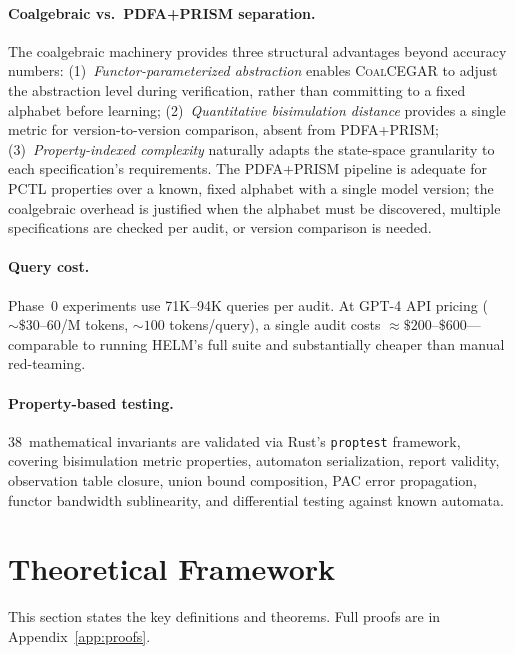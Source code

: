 \documentclass[11pt]{article}
\newcommand{\coalcegar}{\textsc{CoalCEGAR}}
\begin{document}
\paragraph{Coalgebraic vs.\ PDFA+PRISM separation.}
The coalgebraic machinery provides three structural advantages beyond
accuracy numbers:
(1)~\emph{Functor-parameterized abstraction} enables \coalcegar{}
to adjust the abstraction level during verification, rather than
committing to a fixed alphabet before learning;
(2)~\emph{Quantitative bisimulation distance} provides a single
metric for version-to-version comparison, absent from PDFA+PRISM;
(3)~\emph{Property-indexed complexity} naturally adapts the
state-space granularity to each specification's requirements.
The PDFA+PRISM pipeline is adequate for PCTL properties over a
known, fixed alphabet with a single model version; the coalgebraic
overhead is justified when the alphabet must be discovered, multiple
specifications are checked per audit, or version comparison is needed.

\paragraph{Query cost.}
Phase~0 experiments use 71K--94K queries per audit.  At GPT-4 API
pricing (${\sim}\$30$--$60$/M tokens, ${\sim}100$ tokens/query),
a single audit costs ${\approx}\$200$--$\$600$---comparable to
running HELM's full suite and substantially cheaper than manual
red-teaming.

\paragraph{Property-based testing.}
38~mathematical invariants are validated via Rust's \texttt{proptest}
framework, covering bisimulation metric properties, automaton
serialization, report validity, observation table closure,
union bound composition, PAC error propagation, functor bandwidth
sublinearity, and differential testing against known automata.

\section{Theoretical Framework}\label{sec:theory}

This section states the key definitions and theorems.  Full proofs
are in Appendix~\ref{app:proofs}.
\end{document}
